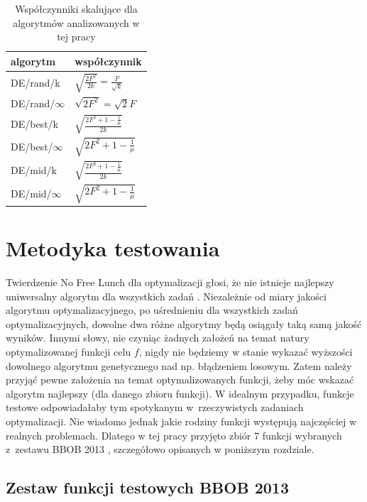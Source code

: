 \documentclass[a4paper,onecolumn,oneside,12pt,wide,floatssmall]{mwrep}
\theoremstyle{definition}
\theoremstyle{plain}%
\theoremstyle{remark}
\begin{document}
\begin{table}[H]
\centering
\begin{tabular}{ l | l }
algorytm         & współczynnik \\ \hline
DE/rand/k        & $\sqrt{\frac{2F^2}{2k}} = \frac{F}{\sqrt{k}}$ \\ 
DE/rand/$\infty$ & $\sqrt{2F^2} = \sqrt{2}F$ \\ \hline
DE/best/k        & $\sqrt{\frac{2F^2 + 1 - \frac{1}{\mu}}{2k}}$ \\
DE/best/$\infty$ & $\sqrt{2F^2 + 1 - \frac{1}{\mu}}$ \\ \hline
DE/mid/k         & $\sqrt{\frac{2F^2 + 1 - \frac{1}{\mu}}{2k}}$ \\
DE/mid/$\infty$  & $\sqrt{2F^2 + 1 - \frac{1}{\mu}}$ \\
\end{tabular}
\caption{Współczynniki skalujące dla algorytmów analizowanych w tej pracy}
\label{table:wspolczynniki}
\end{table}

\chapter{Metodyka testowania}
\label{chap:metodyka}

Twierdzenie No Free Lunch dla optymalizacji głosi, że nie istnieje najlepszy uniwersalny algorytm dla wszystkich zadań \cite{lunch}. 
Niezależnie od miary jakości algorytmu optymalizacyjnego, po uśrednieniu dla wszystkich zadań optymalizacyjnych, 
dowolne dwa różne algorytmy będą osiągały taką samą jakość wyników. Innymi słowy,
nie czyniąc żadnych założeń na temat natury optymalizowanej funkcji celu $f$, 
nigdy nie będziemy w stanie wykazać wyższości dowolnego algorytmu genetycznego nad np. błądzeniem losowym. 
Zatem należy przyjąć pewne założenia na temat optymalizowanych funkcji, żeby móc wskazać algorytm najlepszy (dla danego zbioru funkcji).
W idealnym przypadku, funkcje testowe odpowiadałaby tym spotykanym w~rzeczywistych zadaniach optymalizacji.
Nie wiadomo jednak jakie rodziny funkcji występują najczęściej w realnych problemach.
Dlatego w tej pracy przyjęto zbiór 7 funkcji wybranych z~zestawu BBOB 2013 \cite{noiseless}, szczegółowo opisanych w poniższym rozdziale.

\section{Zestaw funkcji testowych BBOB 2013}
\label{sec:zestaw}
\end{document}
